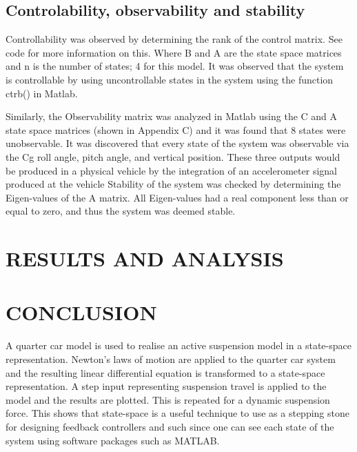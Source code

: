 \documentclass[10pt,twocolumn]{witseiepaper}
\begin{document}
\subsection{Controlability, observability and stability} 


Controllability was observed by determining the rank of the control matrix. See code for more information on this. Where B and A are the state space matrices and n is the number of states; 4 for  this model. It was observed that the system is controllable by using uncontrollable states in the system using the function  ctrb() in Matlab. 

Similarly, the Observability matrix was analyzed in Matlab using the C and A state space matrices (shown in Appendix C) and it was found that 8 states were unobservable. It was discovered that every state of the system was observable via the Cg roll angle, pitch angle, and vertical position. These three outputs would be produced in a physical vehicle by the integration of an accelerometer signal produced at the vehicle
Stability of the system was checked by determining the Eigen-values of the A matrix. All Eigen-values had a real component less than or equal to zero, and thus the system was deemed stable. 

\section{RESULTS AND ANALYSIS}

\section{CONCLUSION}

A quarter car model is used to realise an active suspension model in a state-space representation. Newton's laws of motion are applied to the quarter car system and the resulting linear differential equation is transformed to a state-space representation. A step input representing suspension travel is applied to the model and the results are plotted. This is repeated for a dynamic suspension force. This shows that state-space is a useful technique to use as a stepping stone for designing feedback controllers and such since one can see each state of the system using software packages such as MATLAB.








\end{document}
